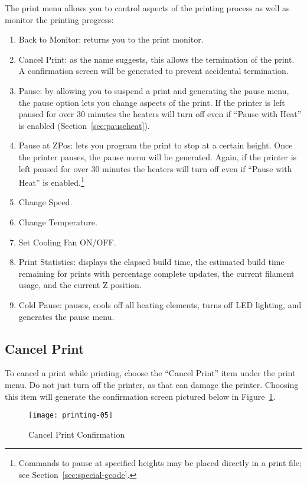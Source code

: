 The print menu allows you to control aspects of the printing process as well as monitor the printing progress:
\begin{enumerate}
\item Back to Monitor: returns you to the print monitor.
\item Cancel Print: as the name suggests, this allows the termination of the print.  A confirmation screen will be generated to prevent accidental termination.
\item Pause: by allowing you to suspend a print and generating the pause menu, the pause option lets you change aspects of the print.  If the printer is left paused for over 30 minutes the heaters will turn off even if ``Pause with Heat'' is enabled (Section~\ref{sec:pauseheat}).
\item Pause at ZPos: lets you program the print to stop at a certain height.  Once the printer pauses, the pause menu will be generated.  Again, if the printer is left paused for over 30 minutes the heaters will turn off even if ``Pause with Heat'' is enabled.\footnote{Commands to pause at specified heights may be placed directly in a print file; see Section~\ref{sec:special-gcode}.}
\item Change Speed.
\item Change Temperature.
\item Set Cooling Fan ON/OFF.
\item Print Statistics: displays the elapsed build time, the estimated build time remaining for prints with percentage complete updates, the current filament usage, and the current Z position. 
\item Cold Pause: pauses, cools off all heating elements, turns off LED lighting, and generates the pause menu.
\end{enumerate}


\subsection{Cancel Print}\label{sec:cancel}

To cancel a print while printing, choose the ``Cancel Print'' item under the print menu.  Do not just turn off the printer, as that can damage the printer.  Choosing this item will generate the confirmation screen pictured below in Figure~\ref{fig:cancel}.

\begin{figure}[!htbp]
  \centering
    \texttt{[image: printing-05]}
    \caption{Cancel Print Confirmation}
  \label{fig:cancel}
\end{figure}

